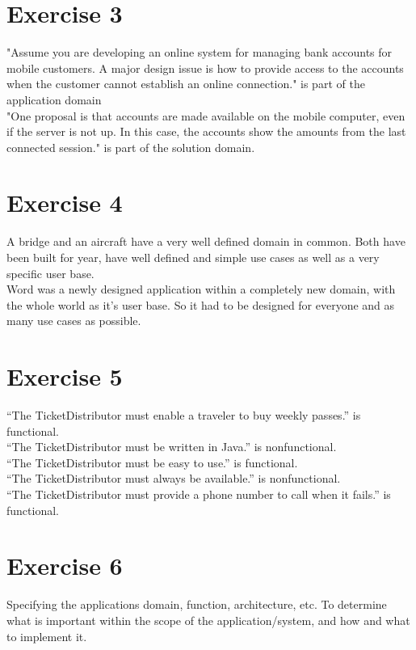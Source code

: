 \documentclass[11pt,oneside]{book}
\begin{document}
   \section{Exercise 3}
   "Assume you are developing an online system for managing bank accounts for mobile customers. A major design issue is how to provide access to the accounts when the customer cannot establish an online connection." is part of the application domain\\
   "One proposal is that accounts are made available on the mobile computer, even if the server is not up. In this case, the accounts show the amounts from the last connected session." is part of the solution domain.
 
   \section{Exercise 4}
   A bridge and an aircraft have a very well defined domain in common. Both have been built for year, have well defined and simple use cases as well as a very specific user base.\\
   Word was a newly designed application within a completely new domain, with the whole world as it's user base. So it had to be designed for everyone and as many use cases as possible.

   \section{Exercise 5}
   “The TicketDistributor must enable a traveler to buy weekly passes.” is functional.\\
   “The TicketDistributor must be written in Java.” is nonfunctional.\\
   “The TicketDistributor must be easy to use.” is functional.\\
   “The TicketDistributor must always be available.” is nonfunctional.\\
   “The TicketDistributor must provide a phone number to call when it fails.” is functional.

   \section{Exercise 6}
   Specifying the applications domain, function, architecture, etc. To determine what is important within the scope of the application/system, and how and what to implement it.
\end{document}
